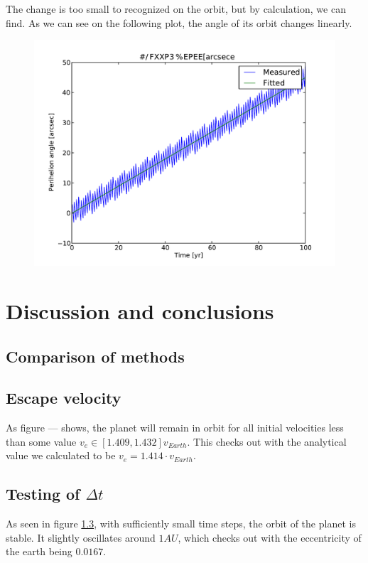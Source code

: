 \documentclass[10pt]{article}
\begin{document}
\begin{multicols}{2}
The change is too small to recognized on the orbit, but by calculation, we
can find. As we can see on the following plot, the angle of its orbit
changes linearly.

\begin{figure}[H]
    \centering
    \includegraphics[width=1.0\linewidth]{../results/peri_precession}
    \label{fig:name}
\end{figure}


\section{Discussion and conclusions}



\subsection{Comparison of methods}

\subsection{Escape velocity}
As figure --- shows, the planet will remain in orbit for all initial velocities less than some value $v_e \in [1.409,1.432]v_{Earth}$. This checks out with the analytical value we calculated to be $v_e = 1.414\cdot v_{Earth}$.



\subsection{Testing of $\Delta t$}
As seen in figure \cref{}, with sufficiently small time steps, the orbit
of the planet is stable. It slightly oscillates around $1AU$, which checks
out with the eccentricity of the earth being $0.0167$.




\end{multicols}
\end{document}

